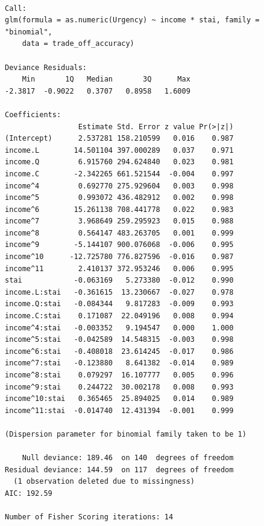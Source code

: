 \begin{verbatim}

Call:
glm(formula = as.numeric(Urgency) ~ income * stai, family = "binomial", 
    data = trade_off_accuracy)

Deviance Residuals: 
    Min       1Q   Median       3Q      Max  
-2.3817  -0.9022   0.3707   0.8958   1.6009  

Coefficients:
                 Estimate Std. Error z value Pr(>|z|)
(Intercept)      2.537281 158.210599   0.016    0.987
income.L        14.501104 397.000289   0.037    0.971
income.Q         6.915760 294.624840   0.023    0.981
income.C        -2.342265 661.521544  -0.004    0.997
income^4         0.692770 275.929604   0.003    0.998
income^5         0.993072 436.482912   0.002    0.998
income^6        15.261138 708.441778   0.022    0.983
income^7         3.968649 259.295923   0.015    0.988
income^8         0.564147 483.263705   0.001    0.999
income^9        -5.144107 900.076068  -0.006    0.995
income^10      -12.725780 776.827596  -0.016    0.987
income^11        2.410137 372.953246   0.006    0.995
stai            -0.063169   5.273380  -0.012    0.990
income.L:stai   -0.361615  13.230667  -0.027    0.978
income.Q:stai   -0.084344   9.817283  -0.009    0.993
income.C:stai    0.171087  22.049196   0.008    0.994
income^4:stai   -0.003352   9.194547   0.000    1.000
income^5:stai   -0.042589  14.548315  -0.003    0.998
income^6:stai   -0.408018  23.614245  -0.017    0.986
income^7:stai   -0.123880   8.641382  -0.014    0.989
income^8:stai    0.079297  16.107777   0.005    0.996
income^9:stai    0.244722  30.002178   0.008    0.993
income^10:stai   0.365465  25.894025   0.014    0.989
income^11:stai  -0.014740  12.431394  -0.001    0.999

(Dispersion parameter for binomial family taken to be 1)

    Null deviance: 189.46  on 140  degrees of freedom
Residual deviance: 144.59  on 117  degrees of freedom
  (1 observation deleted due to missingness)
AIC: 192.59

Number of Fisher Scoring iterations: 14
\end{verbatim}

